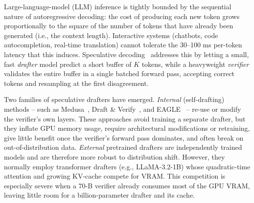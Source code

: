 Large-language-model (LLM) inference is tightly bounded by the sequential nature of autoregressive decoding: the cost of producing each new token grows proportionally to the square of the number of tokens that have already been generated (i.e., the context length).
Interactive systems (chatbots, code autocompletion, real-time translation) cannot tolerate the 30--100 ms per-token latency that this induces.
Speculative decoding~\citep{leviathan2023fast,chen2023accelerating} addresses this by letting a small, fast \emph{drafter} model predict a short buffer of $K$ tokens, while a heavyweight \emph{verifier} validates the entire buffer in a single batched forward pass, accepting correct tokens and resampling at the first disagreement.

Two families of speculative drafters have emerged.
\emph{Internal} (self-drafting) methods -- such as Medusa~\citep{cai2024medusa}, Draft \& Verify~\citep{zhang2024draft}, and EAGLE~\citep{li2024eagle} -- re-use or modify the verifier's own layers.
These approaches avoid training a separate drafter, but they inflate GPU memory usage, require architectural modifications or retraining, give little benefit once the verifier's forward pass dominates, and often break on out-of-distribution data.
\emph{External} pretrained drafters are independently trained models and are therefore more robust to distribution shift.
However, they normally employ transformer drafters (e.g., LLaMA-3.2-1B) whose quadratic-time attention and growing KV-cache compete for VRAM.
This competition is especially severe when a 70-B verifier already consumes most of the GPU VRAM, leaving little room for a billion-parameter drafter and its cache.

